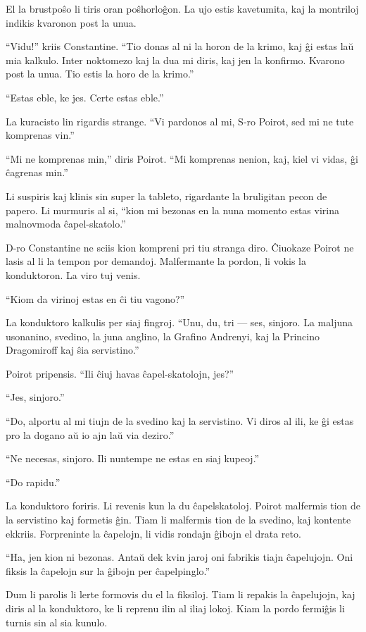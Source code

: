 El la brustpoŝo li tiris oran poŝhorloĝon. La ujo estis kavetumita, kaj la montriloj indikis kvaronon post la unua.

``Vidu!'' kriis Constantine. ``Tio donas al ni la horon de la krimo, kaj ĝi estas laŭ mia kalkulo. Inter noktomezo kaj la dua mi diris, kaj jen la konfirmo. Kvarono post la unua. Tio estis la horo de la krimo.''

``Estas eble, ke jes. Certe estas eble.''

La kuracisto lin rigardis strange. ``Vi pardonos al mi, S-ro Poirot, sed mi ne tute komprenas vin.''

``Mi ne komprenas min,'' diris Poirot. ``Mi komprenas nenion, kaj, kiel vi vidas, ĝi ĉagrenas min.''

Li suspiris kaj klinis sin super la tableto, rigardante la bruligitan pecon de papero. Li murmuris al si, ``kion mi bezonas en la nuna momento estas virina malnovmoda ĉapel-skatolo.''

D-ro Constantine ne sciis kion kompreni pri tiu stranga diro. Ĉiuokaze Poirot ne lasis al li la tempon por demandoj. Malfermante la pordon, li vokis la konduktoron. La viro tuj venis.

``Kiom da virinoj estas en ĉi tiu vagono?''

La konduktoro kalkulis per siaj fingroj. ``Unu, du, tri --- ses, sinjoro. La maljuna usonanino, svedino, la juna anglino, la Grafino Andrenyi, kaj la Princino Dragomiroff kaj ŝia servistino.''

Poirot pripensis. ``Ili ĉiuj havas ĉapel-skatolojn, jes?''

``Jes, sinjoro.''

``Do, alportu al mi tiujn de la svedino kaj la servistino. Vi diros al ili, ke ĝi estas pro la dogano aŭ io ajn laŭ via deziro.''

``Ne necesas, sinjoro. Ili nuntempe ne estas en siaj kupeoj.''

``Do rapidu.''

La konduktoro foriris. Li revenis kun la du ĉapelskatoloj. Poirot malfermis tion de la servistino kaj formetis ĝin. Tiam li malfermis tion de la svedino, kaj kontente ekkriis. Forpreninte la ĉapelojn, li vidis rondajn ĝibojn el drata reto.

``Ha, jen kion ni bezonas. Antaŭ dek kvin jaroj oni fabrikis tiajn ĉapelujojn. Oni fiksis la ĉapelojn sur la ĝibojn per ĉapelpinglo.''

Dum li parolis li lerte formovis du el la fiksiloj. Tiam li repakis la ĉapelujojn, kaj diris al la konduktoro, ke li reprenu ilin al iliaj lokoj. Kiam la pordo fermiĝis li turnis sin al sia kunulo.

